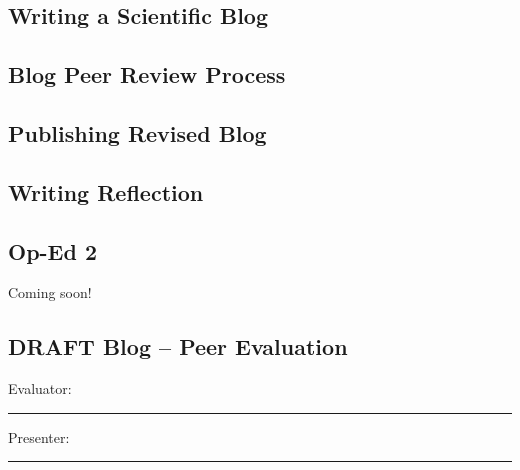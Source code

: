 \documentclass{article}\usepackage[]{graphicx}\usepackage[]{color}
\begin{document}

%

\subsection{Writing a Scientific Blog}




\subsection{Blog Peer Review Process}




\subsection{Publishing Revised Blog}




\subsection{Writing Reflection}



\subsection{Op-Ed 2}

Coming soon! \smiley{}

%


\clearpage
\newpage
\subsection{DRAFT Blog -- Peer Evaluation}

\bigskip
Evaluator: \rule{7cm}{0.4pt}

\bigskip

\noindent Presenter: \rule{7cm}{0.4pt}
\end{document}
